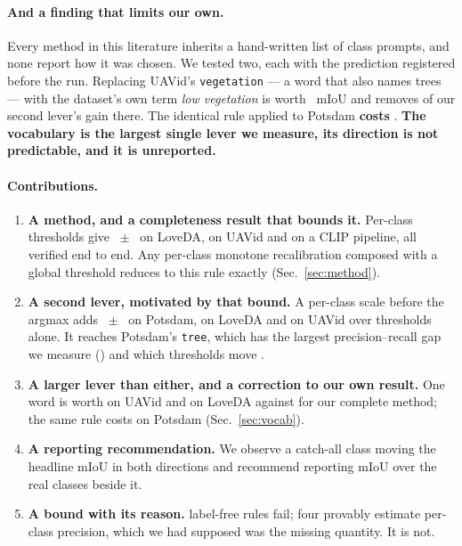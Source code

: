 \documentclass[10pt,twocolumn,letterpaper]{article}          %
\newcommand{\best}[1]{\textbf{#1}}
\begin{document}
\paragraph{And a finding that limits our own.} Every method in this literature
inherits a hand-written list of class prompts, and none report how it was chosen.
We tested two, each with the prediction registered before the run. Replacing UAVid's
\texttt{vegetation} --- a word that also names trees --- with the dataset's own term
\emph{low vegetation} is worth \vocUavGain{}~mIoU and removes \uavScaleLost{} of our
second lever's gain there. The identical rule applied to Potsdam \best{costs}
\vocPotsGain{}. \best{The vocabulary is the largest single lever we measure, its
direction is not predictable, and it is unreported.}

\paragraph{Contributions.}
\begin{enumerate}\itemsep2pt
  \item \textbf{A method, and a completeness result that bounds it.} Per-class
        thresholds give \methodGain{}~$\pm$~\methodSD{} on LoveDA, \uavTauCV{} on
        UAVid and \cnCV{} on a CLIP pipeline, all verified end to end. Any per-class
        monotone recalibration composed with a global threshold reduces to this rule
        exactly (Sec.~\ref{sec:method}).
  \item \textbf{A second lever, motivated by that bound.} A per-class scale before
        the argmax adds \scPots{}~$\pm$~\scPotsSD{} on Potsdam, \scLove{} on LoveDA
        and \uavScaleCV{} on UAVid over thresholds alone. It reaches Potsdam's
        \texttt{tree}, which has the largest precision--recall gap we measure
        (\treeGap{}) and which thresholds move \treeTau{}.
  \item \textbf{\best{A larger lever than either, and a correction to our own
        result.}} One word is worth \vocUavGain{} on UAVid and \vocLoveBarren{} on
        LoveDA against \loveTotal{} for our complete method; the same rule costs
        \vocPotsGain{} on Potsdam (Sec.~\ref{sec:vocab}).
  \item \textbf{A reporting recommendation.} We observe a catch-all class moving the
        headline mIoU in both directions and recommend reporting mIoU over the real
        classes beside it.
  \item \textbf{A bound with its reason.} \nAttempts{} label-free rules fail; four
        provably estimate per-class precision, which we had supposed was the missing
        quantity. It is not.
\end{enumerate}
\end{document}
